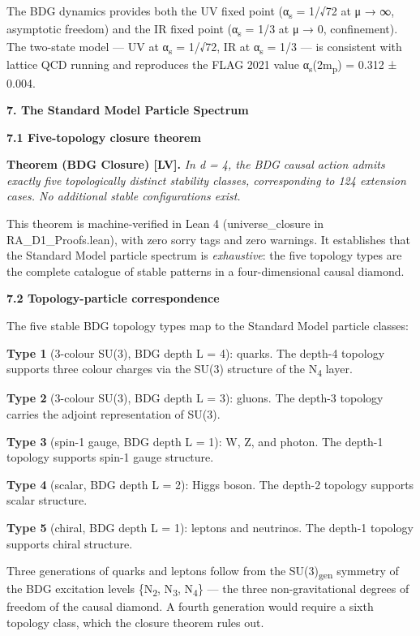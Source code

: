 \documentclass[12pt,a4paper]{article}
\begin{document}
The BDG dynamics provides both the UV fixed point (α\textsubscript{s} =
1/√72 at μ → ∞, asymptotic freedom) and the IR fixed point
(α\textsubscript{s} = 1/3 at μ → 0, confinement). The two-state model
--- UV at α\textsubscript{s} = 1/√72, IR at α\textsubscript{s} = 1/3 ---
is consistent with lattice QCD running and reproduces the FLAG 2021
value α\textsubscript{s}(2m\textsubscript{p}) = 0.312 ± 0.004.

\textbf{7. The Standard Model Particle Spectrum}

\textbf{7.1 Five-topology closure theorem}

\textbf{Theorem (BDG Closure) {[}LV{]}.} \emph{In d = 4, the BDG causal
action admits exactly five topologically distinct stability classes,
corresponding to 124 extension cases. No additional stable
configurations exist.}

This theorem is machine-verified in Lean 4 (universe\_closure in
RA\_D1\_Proofs.lean), with zero sorry tags and zero warnings. It
establishes that the Standard Model particle spectrum is
\emph{exhaustive}: the five topology types are the complete catalogue of
stable patterns in a four-dimensional causal diamond.

\textbf{7.2 Topology-particle correspondence}

The five stable BDG topology types map to the Standard Model particle
classes:

\textbf{Type 1} (3-colour SU(3), BDG depth L = 4): quarks. The depth-4
topology supports three colour charges via the SU(3) structure of the
N\textsubscript{4} layer.

\textbf{Type 2} (3-colour SU(3), BDG depth L = 3): gluons. The depth-3
topology carries the adjoint representation of SU(3).

\textbf{Type 3} (spin-1 gauge, BDG depth L = 1): W, Z, and photon. The
depth-1 topology supports spin-1 gauge structure.

\textbf{Type 4} (scalar, BDG depth L = 2): Higgs boson. The depth-2
topology supports scalar structure.

\textbf{Type 5} (chiral, BDG depth L = 1): leptons and neutrinos. The
depth-1 topology supports chiral structure.

Three generations of quarks and leptons follow from the
SU(3)\textsubscript{gen} symmetry of the BDG excitation levels
\{N\textsubscript{2}, N\textsubscript{3}, N\textsubscript{4}\} --- the
three non-gravitational degrees of freedom of the causal diamond. A
fourth generation would require a sixth topology class, which the
closure theorem rules out.
\end{document}
